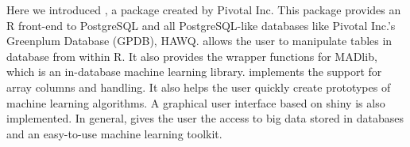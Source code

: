 Here we introduced , a package created by Pivotal
Inc. This package provides an R front-end to PostgreSQL and all
PostgreSQL-like databases like Pivotal Inc.'s Greenplum Database
(GPDB), HAWQ.  allows the user to manipulate tables in
database from within R. It also provides the wrapper functions for
MADlib,
which is an in-database machine learning library. 
implements the support for array columns and  handling. It
also helps the user quickly create prototypes of machine learning
algorithms. A graphical user interface based on shiny is also
implemented. In general,  gives the user the access to
big data stored in databases and an easy-to-use machine learning
toolkit.



\address{Hai Qian\\
  Pivotal Inc.\\
  3495 Deer Creek Rd., Palo Alto, CA 94304\\
  USA}


